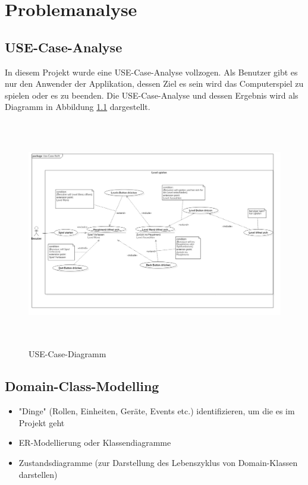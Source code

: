 \chapter{Problemanalyse}
\section{USE-Case-Analyse}
In diesem Projekt wurde eine USE-Case-Analyse vollzogen. Als Benutzer gibt es nur den Anwender der Applikation, dessen Ziel es sein wird das Computerspiel zu spielen oder es zu beenden. Die USE-Case-Analyse und dessen Ergebnis wird als Diagramm in Abbildung \ref{USE-Case-Diagramm} dargestellt.
\begin{figure}[H]
	\centering
	\includegraphics[width=17.5cm,height=10cm]{images/UseCaseDiagram.jpg}
	\caption{USE-Case-Diagramm}
	\label{USE-Case-Diagramm}
\end{figure}
\section{Domain-Class-Modelling}
\begin{itemize}
	\item "Dinge" (Rollen, Einheiten, Geräte, Events etc.) identifizieren, um die es im Projekt geht
	\item ER-Modellierung oder Klassendiagramme
	\item Zustandsdiagramme (zur Darstellung des Lebenszyklus von Domain-Klassen darstellen)
\end{itemize}

